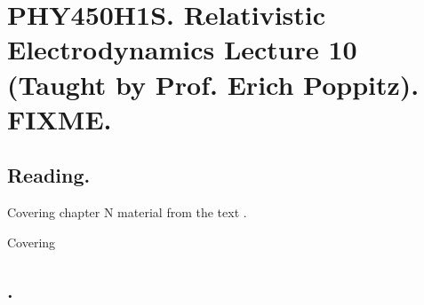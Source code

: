 
%

\chapter{PHY450H1S.  Relativistic Electrodynamics Lecture 10 (Taught by Prof. Erich Poppitz).  FIXME.}
\label{chap:relativisticElectrodynamicsL10}
{}
\date{Feb 8, 2011}

\beginArtNoToc

\section{Reading.}

Covering chapter N material from the text \cite{landau1980classical}.

Covering \href{}{}

\section{.}

\EndArticle
